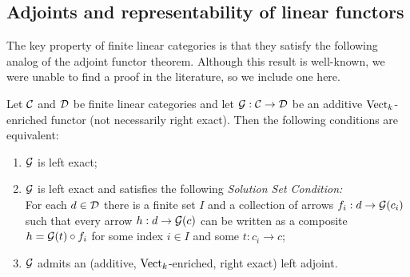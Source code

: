 \documentclass{amsart}
\begin{document}
\subsection{Adjoints and representability of linear functors}

The key property of finite linear categories is that they satisfy the following analog of the adjoint functor theorem.  Although this result is well-known, we were unable to find a proof in the literature, so we include one here.  

\begin{proposition} \label{prop:AFT}
	Let $\mathcal C$ and $\mathcal D$ be finite linear categories and let $\mathcal G: \mathcal C \rightarrow \mathcal D$  be an additive $\mathrm{Vect}_k$-enriched functor (not necessarily right exact). Then the following conditions are equivalent: 
	\begin{enumerate}
		\item $\mathcal G$ is left exact;  
		\item $\mathcal G$ is left exact and satisfies the following {\em Solution Set Condition:} \\  For each $d \in \mathcal D$ there is a finite set $I$ and a collection of arrows $f_i:d \to \mathcal G(c_i)$ such that every arrow $h:d \to \mathcal G(c)$ can be written as a composite $h = \mathcal G(t) \circ f_i$ for some index $i \in I$ and some $t: c_i \to c$; 
		\item $\mathcal G$ admits an (additive, ${\mathrm{Vect}_k}$-enriched, right exact) left adjoint.
	\end{enumerate}
\end{proposition}
\end{document}
